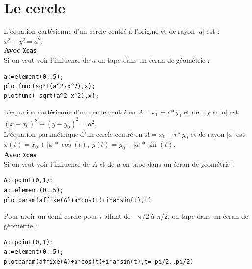 \documentclass[a4paper,11pt]{book}
\begin{document}
\section{Le cercle}
\noindent L'\'equation cart\'esienne d'un cercle centr\'e \`a l'origine et 
de rayon $|a|$ est :\\
$x^2+y^2=a^2$.\\
{\bf Avec {\tt Xcas}}\\
Si on veut voir l'influence de $a$ on tape dans un \'ecran de 
g\'eom\'etrie :
\begin{verbatim}
a:=element(0..5);
plotfunc(sqrt(a^2-x^2),x);
plotfunc(-sqrt(a^2-x^2),x);
\end{verbatim}
L'\'equation cart\'esienne d'un cercle centr\'e en $A=x_0+i*y_0$ et 
de rayon $|a|$ est $(x-x_0)^2+(y-y_0)^2=a^2$.\\
L'\'equation param\'etrique d'un cercle centr\'e en $A=x_0+i*y_0$ et 
de rayon $|a|$  est
 $x(t)=x_0+|a|*\cos(t),\ y(t)=y_0+|a|*\sin(t)$.\\
{\bf Avec {\tt Xcas}}\\
Si on veut voir l'influence de $A$ et de $a$ on tape dans un \'ecran de 
g\'eom\'etrie :
\begin{verbatim}
A:=point(0,1);
a:=element(0..5);
plotparam(affixe(A)+a*cos(t)+i*a*sin(t),t)
\end{verbatim}
Pour avoir un demi-cercle pour $t$ allant de $-\pi/2$ \`a $\pi/2$, on tape 
dans un \'ecran de g\'eom\'etrie :
\begin{verbatim}
A:=point(0,1);
a:=element(0..5);
plotparam(affixe(A)+a*cos(t)+i*a*sin(t),t=-pi/2..pi/2)
\end{verbatim}
\end{document}
